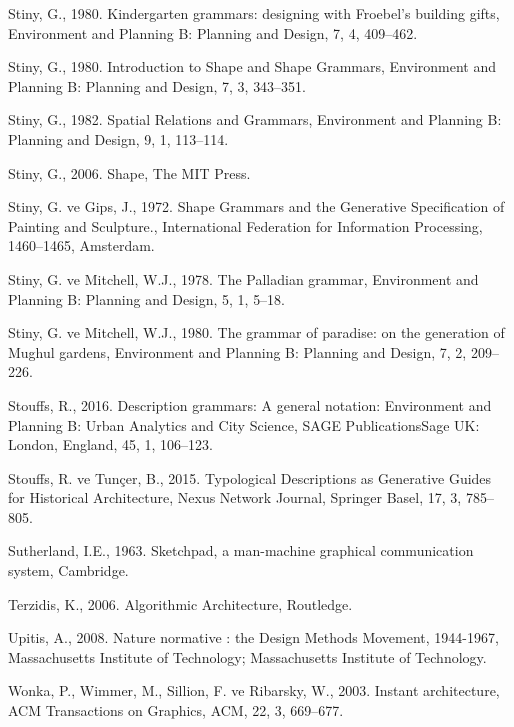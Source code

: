 \documentclass[12pt,turkish,a4paperpaper,]{report}
\begin{document}
\leavevmode\hypertarget{ref-Stiny:1980kq}{}%
Stiny, G., 1980. Kindergarten grammars: designing with Froebel's
building gifts, Environment and Planning B: Planning and Design, 7, 4,
409--462.

\leavevmode\hypertarget{ref-Stiny:1980it}{}%
Stiny, G., 1980. Introduction to Shape and Shape Grammars, Environment
and Planning B: Planning and Design, 7, 3, 343--351.

\leavevmode\hypertarget{ref-Stiny:1982cn}{}%
Stiny, G., 1982. Spatial Relations and Grammars, Environment and
Planning B: Planning and Design, 9, 1, 113--114.

\leavevmode\hypertarget{ref-Stiny:2006tq}{}%
Stiny, G., 2006. Shape, The MIT Press.

\leavevmode\hypertarget{ref-Stiny:1972tt}{}%
Stiny, G. ve Gips, J., 1972. Shape Grammars and the Generative
Specification of Painting and Sculpture., International Federation for
Information Processing, 1460--1465, Amsterdam.

\leavevmode\hypertarget{ref-Stiny:1978cl}{}%
Stiny, G. ve Mitchell, W.J., 1978. The Palladian grammar, Environment
and Planning B: Planning and Design, 5, 1, 5--18.

\leavevmode\hypertarget{ref-Stiny:1980dya}{}%
Stiny, G. ve Mitchell, W.J., 1980. The grammar of paradise: on the
generation of Mughul gardens, Environment and Planning B: Planning and
Design, 7, 2, 209--226.

\leavevmode\hypertarget{ref-Stouffs:2016ip}{}%
Stouffs, R., 2016. Description grammars: A general notation: Environment
and Planning B: Urban Analytics and City Science, SAGE PublicationsSage
UK: London, England, 45, 1, 106--123.

\leavevmode\hypertarget{ref-Stouffs:2015if}{}%
Stouffs, R. ve Tunçer, B., 2015. Typological Descriptions as Generative
Guides for Historical Architecture, Nexus Network Journal, Springer
Basel, 17, 3, 785--805.

\leavevmode\hypertarget{ref-Sutherland:1963tw}{}%
Sutherland, I.E., 1963. Sketchpad, a man-machine graphical communication
system, Cambridge.

\leavevmode\hypertarget{ref-Terzidis:2006ud}{}%
Terzidis, K., 2006. Algorithmic Architecture, Routledge.

\leavevmode\hypertarget{ref-Upitis:2008wi}{}%
Upitis, A., 2008. Nature normative : the Design Methods Movement,
1944-1967, Massachusetts Institute of Technology; Massachusetts
Institute of Technology.

\leavevmode\hypertarget{ref-Wonka:2003bn}{}%
Wonka, P., Wimmer, M., Sillion, F. ve Ribarsky, W., 2003. Instant
architecture, ACM Transactions on Graphics, ACM, 22, 3, 669--677.
\end{document}
